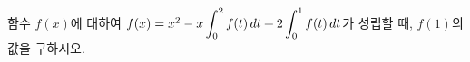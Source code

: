 함수 $f(x)$에 대하여 $f(x)=x^2-x\displaystyle\int_{0}^{2}f(t)\mkern3mu dt+2\int_{0}^{1}f(t)\mkern3mu dt$가 성립할 때, $f(1)$의 값을 구하시오.

